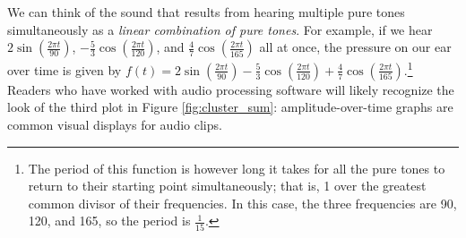 \par We can think of the sound that results from hearing multiple pure tones simultaneously as a \textit{linear combination of pure tones}. For example, if we hear $2\sin(\frac{2\pi t}{90})$, $-\frac{5}{3}\cos(\frac{2\pi t}{120})$, and $\frac{4}{7}\cos(\frac{2\pi t}{165})$ all at once, the pressure on our ear over time is given by $f(t) = 2\sin(\frac{2\pi t}{90}) - \frac{5}{3}\cos(\frac{2\pi t}{120}) + \frac{4}{7}\cos(\frac{2\pi t}{165})$.\footnote{The period of this function is however long it takes for all the pure tones to return to their starting point simultaneously; that is, 1 over the greatest common divisor of their frequencies. In this case, the three frequencies are 90, 120, and 165, so the period is $\frac{1}{15}$.} Readers who have worked with audio processing software will likely recognize the look of the third plot in Figure \ref{fig:cluster_sum}: amplitude-over-time graphs are common visual displays for audio clips.

